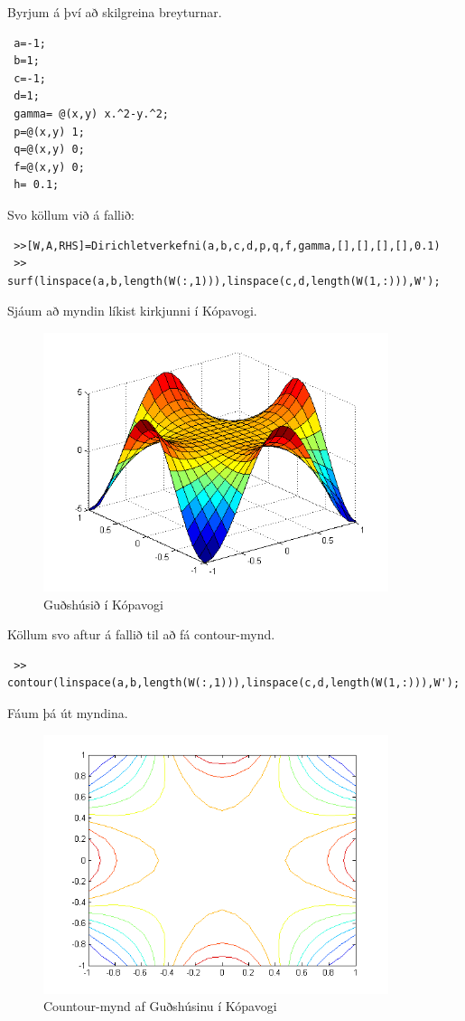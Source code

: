 \documentclass[11pt,a4paper,titlepage]{article}
\begin{document}
 Byrjum á því að skilgreina breyturnar.
 \begin{verbatim}
 a=-1;
 b=1;
 c=-1;
 d=1;
 gamma= @(x,y) x.^2-y.^2;
 p=@(x,y) 1;
 q=@(x,y) 0;
 f=@(x,y) 0;
 h= 0.1;
 \end{verbatim}
 Svo köllum við á fallið:
 \begin{verbatim}
 >>[W,A,RHS]=Dirichletverkefni(a,b,c,d,p,q,f,gamma,[],[],[],[],0.1)
 >> surf(linspace(a,b,length(W(:,1))),linspace(c,d,length(W(1,:))),W');
 \end{verbatim}
Sjáum að myndin líkist kirkjunni í Kópavogi.
  \begin{figure}[h!]
      \centering
      \includegraphics[width=0.9\textwidth]{gudshusid.png}
      \caption{Guðshúsið í Kópavogi}
      \label{fig:awesome_image7}
  \end{figure} 
  
  
 Köllum svo aftur á fallið til að fá contour-mynd.
 \begin{verbatim}
 >> contour(linspace(a,b,length(W(:,1))),linspace(c,d,length(W(1,:))),W');
 \end{verbatim}
 
 Fáum þá út myndina.
 
 \begin{figure}[h!]
       \centering
       \includegraphics[width=0.9\textwidth]{gudshusid_contour.png}
       \caption{Countour-mynd af Guðshúsinu í Kópavogi}
       \label{fig:awesome_image8}
   \end{figure}
   
\end{document}
